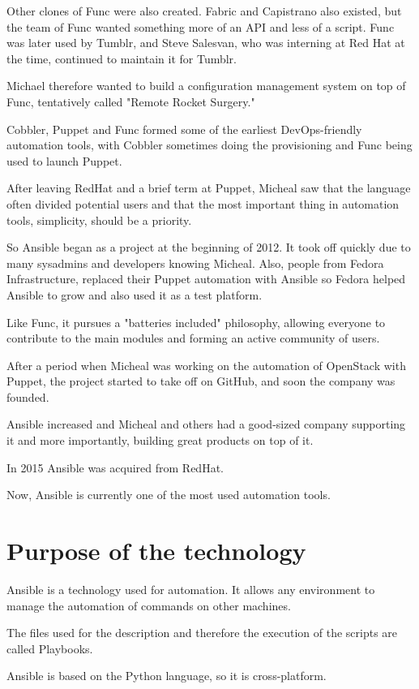 \documentclass[12pt,a4paper,openright,twoside]{book}
\begin{document}
Other clones of Func were also created. Fabric and Capistrano also existed, but the team of Func wanted something more of an API and less of a script. Func was later used by Tumblr, and Steve Salesvan, who was interning at Red Hat at the time, continued to maintain it for Tumblr.


Michael therefore wanted to build a configuration management system on top of Func, tentatively called "Remote Rocket Surgery."


Cobbler, Puppet and Func formed some of the earliest DevOps-friendly automation tools, with Cobbler sometimes doing the provisioning and Func being used to launch Puppet.


After leaving RedHat and a brief term at Puppet, Micheal saw that the language often divided potential users and that the most important thing in automation tools, simplicity, should be a priority.


So Ansible began as a project at the beginning of 2012. It took off quickly due to many sysadmins and developers knowing Micheal.
Also, people from Fedora Infrastructure, replaced their Puppet automation with Ansible so Fedora helped Ansible to grow and also used it as a test platform.


Like Func, it pursues a "batteries included" philosophy, allowing everyone to contribute to the main modules and forming an active community of users.


After a period when Micheal was working on the automation of OpenStack with Puppet, the project started to take off on GitHub, and soon the company was founded.


Ansible increased and Micheal and others had a good-sized company supporting it and more importantly, building great products on top of it.


In 2015 Ansible was acquired from RedHat\cite{ansibleRedHat}.


Now, Ansible is currently one of the most used automation tools.

\section{Purpose of the technology}
Ansible is a technology used for automation. It allows any environment to manage the automation of commands on other machines.


The files used for the description and therefore the execution of the scripts are called Playbooks.


Ansible is based on the Python language, so it is cross-platform.
\end{document}
